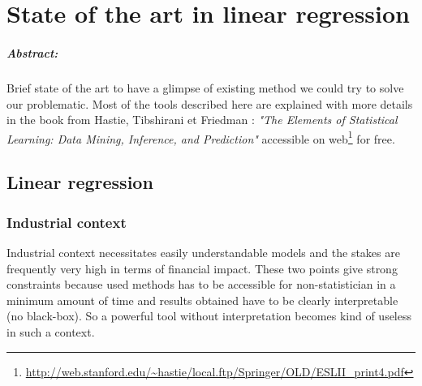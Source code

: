 \documentclass[12pt,a4paper]{report}
\begin{document}
\chapter{State of the art in linear regression}
\paragraph{Abstract:} Brief state of the art to have a glimpse of existing method we could try to solve our problematic.
Most of the tools described here are explained with more details in the book from  Hastie, Tibshirani et Friedman : {\it "The Elements of Statistical Learning: Data Mining, Inference, and Prediction" } accessible on web\footnote{ \url{http://web.stanford.edu/~hastie/local.ftp/Springer/OLD/ESLII_print4.pdf}} for free.
	

	
	\section{Linear regression}
%			
		\subsection{Industrial context}
		
			Industrial context necessitates easily understandable models and the stakes are frequently very high in terms of financial impact. 
		These two points give strong constraints because used methods has to be accessible for non-statistician in a minimum amount of time and results obtained have to be clearly interpretable (no black-box). So a powerful tool without interpretation becomes kind of useless in such a context.\\
		
\end{document}
